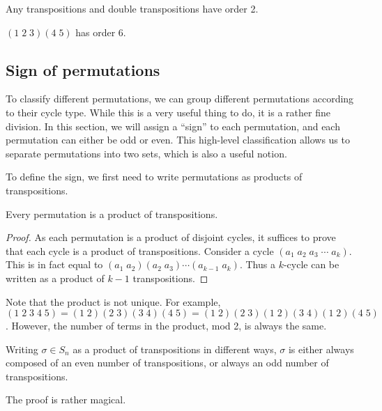 \documentclass[a4paper]{article}
\begin{document}
\begin{eg}
  Any transpositions and double transpositions have order 2.

  $(1\; 2\; 3)(4\; 5)$ has order 6.
\end{eg}

\subsection{Sign of permutations}
To classify different permutations, we can group different permutations according to their cycle type. While this is a very useful thing to do, it is a rather fine division. In this section, we will assign a ``sign'' to each permutation, and each permutation can either be odd or even. This high-level classification allows us to separate permutations into two sets, which is also a useful notion.

To define the sign, we first need to write permutations as products of transpositions.
\begin{prop}
  Every permutation is a product of transpositions.
\end{prop}

\begin{proof}
  As each permutation is a product of disjoint cycles, it suffices to prove that each cycle is a product of transpositions. Consider a cycle $(a_1\; a_2\; a_3\; \cdots\; a_k)$. This is in fact equal to $(a_1\; a_2)(a_2\; a_3)\cdots (a_{k-1}\; a_k)$. Thus a $k$-cycle can be written as a product of $k - 1$ transpositions.
\end{proof}

Note that the product is not unique. For example, $(1\; 2\; 3\; 4\; 5) =(1\; 2)(2\; 3)(3\; 4)(4\; 5) = (1\; 2)(2\; 3)(1\; 2)(3\; 4)(1\; 2)(4\; 5)$. However, the number of terms in the product, mod 2, is always the same.

\begin{thm}
  Writing $\sigma\in S_n$ as a product of transpositions in different ways, $\sigma$ is either always composed of an even number of transpositions, or always an odd number of transpositions.
\end{thm}
The proof is rather magical.
\end{document}
